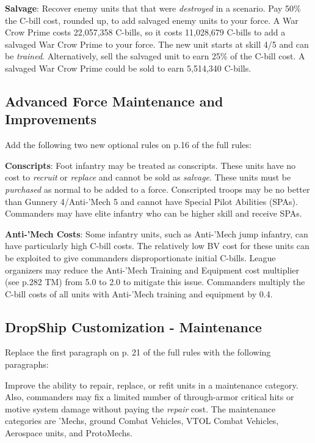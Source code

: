 {\bfseries Salvage}: Recover enemy units that that were \emph{destroyed} in a scenario.
Pay 50\% the C-bill cost, rounded up, to add salvaged enemy units to your force.
A War Crow Prime costs 22,057,358 C-bills, so it costs 11,028,679 C-bills to add a salvaged War Crow Prime to your force.
The new unit starts at skill 4/5 and can be \emph{trained}.
Alternatively, sell the salvaged unit to earn 25\% of the C-bill cost.
A salvaged War Crow Prime could be sold to earn 5,514,340 C-bills.

\subsection{Advanced Force Maintenance and Improvements}

Add the following two new optional rules on p.16 of the full rules:

\begin{description}

\item {\bfseries Conscripts}: Foot infantry may be treated as conscripts.
These units have no cost to \emph{recruit} or \emph{replace} and cannot be sold as \emph{salvage}.
These units must be \emph{purchased} as normal to be added to a force.
Conscripted troops may be no better than Gunnery 4/Anti-'Mech 5 and cannot have Special Pilot Abilities (SPAs).
Commanders may have elite infantry who can be higher skill and receive SPAs.

\item {\bfseries Anti-'Mech Costs}: Some infantry units, such as Anti-'Mech jump infantry, can have particularly high C-bill costs.
The relatively low BV cost for these units can be exploited to give commanders disproportionate initial C-bills.
League organizers may reduce the Anti-'Mech Training and Equipment cost multiplier (see p.282 TM) from 5.0 to 2.0 to mitigate this issue.
Commanders multiply the C-bill costs of all units with Anti-'Mech training and equipment by 0.4.

\end{description}

\subsection{DropShip Customization - Maintenance}

Replace the first paragraph on p. 21 of the full rules with the following paragraphs:

Improve the ability to repair, replace, or refit units in a maintenance category.
Also, commanders may fix a limited number of through-armor critical hits or motive system damage without paying the \emph{repair} cost.
The maintenance categories are 'Mechs, ground Combat Vehicles, VTOL Combat Vehicles, Aerospace units, and ProtoMechs.


